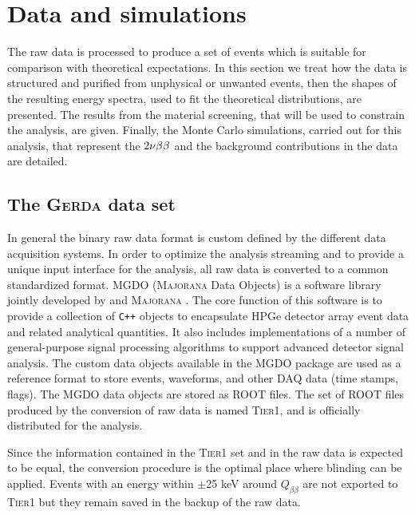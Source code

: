 \section{Data and simulations}\label{sec:data}
The raw data is processed to produce a set of events which is suitable for comparison with theoretical expectations. In this section we treat how the data is structured and purified from unphysical or unwanted events, then the shapes of the resulting energy spectra, used to fit the theoretical distributions, are presented. The results from the material screening, that will be used to constrain the analysis, are given. Finally, the Monte Carlo simulations, carried out for this analysis, that represent the $2\nu\beta\beta$ and the background contributions in the data are detailed.
\subsection*{The \textsc{Gerda} data set}
 In general the binary raw data format is custom defined by the different data acquisition systems. In order to optimize the analysis streaming and to provide a unique input interface for the analysis, all raw data is converted to a common standardized format. MGDO \cite{MGDO} (\textsc{Majorana} {\gerda} Data Objects) is a software library jointly developed by {\gerda} and \textsc{Majorana} \cite{majoranadem}. The core function of this software is to provide a collection of \texttt{C++} objects to encapsulate HPGe detector array event data and related analytical quantities. It also includes implementations of a number of general-purpose signal processing algorithms to support advanced detector signal analysis. The custom data objects available in the MGDO package are used as a reference format to store events, waveforms, and other DAQ data (time stamps, flags). The MGDO data objects are stored as ROOT \cite{ROOT} files. The set of ROOT files produced by the conversion of raw data is named \textsc{Tier1}, and is officially distributed for the analysis.

Since the information contained in the \textsc{Tier1} set and in the raw data is expected to be equal, the conversion procedure is the optimal place where blinding can be applied. Events with an energy within $\pm$25 keV around $Q_{\beta\beta}$ are not exported to \textsc{Tier1} but they remain saved in the backup of the raw data.

